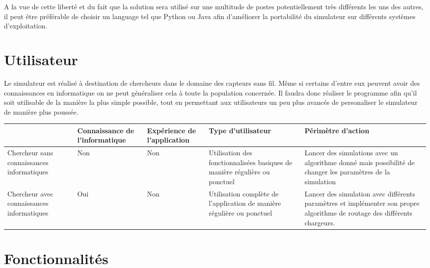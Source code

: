 \documentclass[noposter]{polytech}
\begin{document}
		A la vue de cette liberté et du fait que la solution sera utilisé sur une multitude de postes potentiellement très différents les uns des autres, il peut être préférable de choisir un language tel que Python ou Java afin d'améliorer la portabilité du simulateur sur différents systèmes d'exploitation.
	
	\section{Utilisateur} %
		Le simulateur est réalisé à destination de chercheurs dans le domaine des capteurs sans fil.
		Même si certains d'entre eux peuvent avoir des connaissances en informatique on ne peut généraliser cela à toute la population concernée.
		Il faudra donc réaliser le programme afin qu'il soit utilisable de la manière la plus simple possible, tout en permettant aux utilisateurs un peu plus avancés de personaliser le simulateur de manière plus poussée.
		
		\begin{center}
			\centering
			\begin{tabularx}{\textwidth}{|X|X|X|X|X|}
				\hline
				& Connaissance de l'informatique & Expérience de l'application & Type d'utilisateur & Périmètre d'action\\\hline
				Chercheur sans connaissances informatiques & Non & Non & Utilisation des fonctionnalisées basiques de manière régulière ou ponctuel & Lancer des simulations avec un algorithme donné mais possibilité de changer les paramètres de la simulation\\\hline
				Chercheur avec connaissances informatiques & Oui & Non & Utilisation complète de l'application de manière régulière ou ponctuel & Lancer des simulation avec différents paramètres et implémenter son propre algorithme de routage des différents chargeurs.\\\hline
			\end{tabularx}
		\end{center}

	
	\section{Fonctionnalités}%
		
\end{document}
